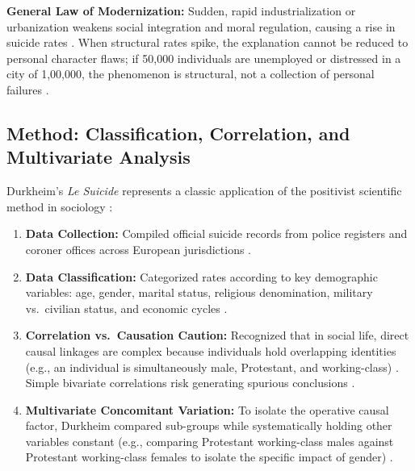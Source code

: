 \begin{KeyConcept}
\textbf{General Law of Modernization:}
Sudden, rapid industrialization or urbanization weakens social integration and moral regulation, causing a rise in suicide rates . When structural rates spike, the explanation cannot be reduced to personal character flaws; if 50,000 individuals are unemployed or distressed in a city of 1,00,000, the phenomenon is structural, not a collection of personal failures .
\end{KeyConcept}

\subsection{Method: Classification, Correlation, and Multivariate Analysis}

Durkheim's \textit{Le Suicide} represents a classic application of the positivist scientific method in sociology :
\begin{enumerate}
    \item \textbf{Data Collection:} Compiled official suicide records from police registers and coroner offices across European jurisdictions .
    \item \textbf{Data Classification:} Categorized rates according to key demographic variables: age, gender, marital status, religious denomination, military vs.\ civilian status, and economic cycles .
    \item \textbf{Correlation vs.\ Causation Caution:} Recognized that in social life, direct causal linkages are complex because individuals hold overlapping identities (e.g., an individual is simultaneously male, Protestant, and working-class) . Simple bivariate correlations risk generating spurious conclusions .
    \item \textbf{Multivariate Concomitant Variation:} To isolate the operative causal factor, Durkheim compared sub-groups while systematically holding other variables constant (e.g., comparing Protestant working-class males against Protestant working-class females to isolate the specific impact of gender) .
\end{enumerate}

